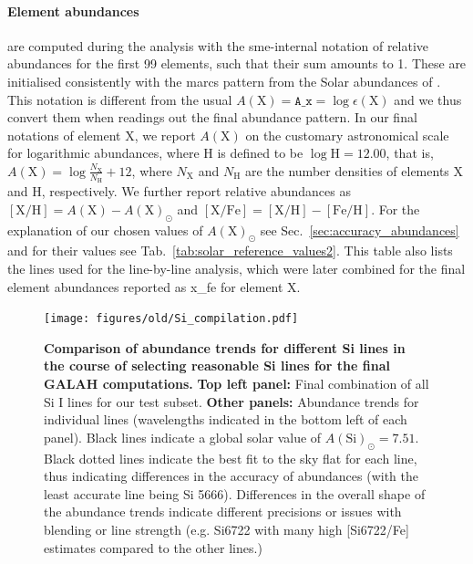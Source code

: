 \documentclass[fleqn,usenatbib,useAMS]{mnras}
\begin{document}
\paragraph*{Element abundances} are computed during the analysis with the {\sc sme}-internal notation of relative abundances for the first 99 elements, such that their sum amounts to 1. These are initialised consistently with the {\sc marcs} pattern from the Solar abundances of \citet{Grevesse2007}. This notation is different from the usual $A(\mathrm{X}) = \texttt{A\_x} = \log \epsilon (\mathrm{X})$ and we thus convert them when readings out the final abundance pattern. In our final notations of element X, we report $A(\mathrm{X})$ on the customary astronomical scale for logarithmic abundances, where H is defined to be $\log \mathrm{H} = 12.00$, that is, $A(\mathrm{X})= \log \frac{N_\mathrm{X}}{N_\mathrm{H}} + 12$, where $N_\mathrm{X}$ and $N_\mathrm{H}$ are the number densities of elements X and H, respectively. We further report relative abundances as $\mathrm{[X/H]} = A(\mathrm{X}) - A(\mathrm{X})_\odot$ and $\mathrm{[X/Fe]} = \mathrm{[X/H]} - \mathrm{[Fe/H]}$. For the explanation of our chosen values of $A(\mathrm{X})_\odot$ see Sec.~\ref{sec:accuracy_abundances} and for their values see Tab.~\ref{tab:solar_reference_values2}. This table also lists the lines used for the line-by-line analysis, which were later combined for the final element abundances reported as {\sc x\_fe} for element X.

\begin{figure}
\centering
\texttt{[image: figures/old/Si\_compilation.pdf]}
\caption{
\textbf{Comparison of abundance trends for different Si lines in the course of selecting reasonable Si lines for the final GALAH computations.}
\textbf{Top left panel:} Final combination of all Si I lines for our test subset. \textbf{Other panels: } Abundance trends for individual lines (wavelengths indicated in the bottom left of each panel). Black lines indicate a global solar value of $A(\mathrm{Si})_\odot = 7.51$. Black dotted lines indicate the best fit to the sky flat for each line, thus indicating differences in the accuracy of abundances (with the least accurate line being Si 5666). Differences in the overall shape of the abundance trends indicate different precisions or issues with blending or line strength (e.g. Si6722 with many high [Si6722/Fe] estimates compared to the other lines.)
}
\label{fig:Si_abundance_zeropoint_differences}
\end{figure}
\end{document}
